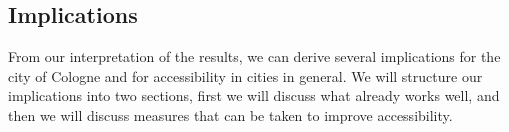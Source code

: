 

\subsection{Implications}
\label{sec:implications}

From our interpretation of the results, we can derive several implications for the city of Cologne and for accessibility in cities in general.
We will structure our implications into two sections, first we will discuss what already works well, and then we will discuss measures that can be taken to improve accessibility.


